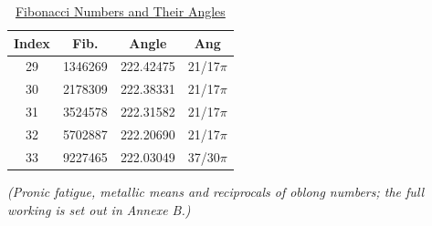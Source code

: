 \begin{table}[H]
\centering
\begin{tabular}{|c|c|c|c|}
\hline
Index & Fib. & Angle & Ang \\ \hline
29 & 1346269 & 222.42475 & 21/17$\pi$ \\ 
30 & 2178309 & 222.38331 & 21/17$\pi$ \\ 
31 & 3524578 & 222.31582 & 21/17$\pi$ \\ 
32 & 5702887 & 222.20690 & 21/17$\pi$ \\ 
33 & 9227465 & 222.03049 & 37/30$\pi$ \\ 
\hline
\end{tabular}
\caption{\href{https://colab.research.google.com/drive/1HQ3Xi8BDiK5kH8peRprMypboWtOb1vVn?usp=sharing}{Fibonacci Numbers and Their Angles}}
\end{table}



\textit{(Pronic fatigue, metallic means and reciprocals of oblong numbers; the full working is set out in Annexe B.)}

